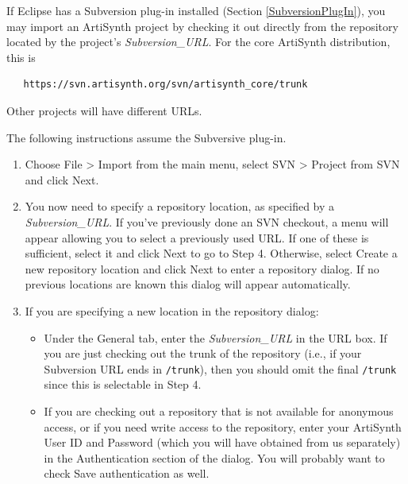 \documentclass{article}
\begin{document}
If Eclipse has a Subversion plug-in installed (Section
\ref{SubversionPlugIn}), you may import an ArtiSynth project by
checking it out directly from the repository located by
the project's {\it Subversion\_URL}. For the core ArtiSynth
distribution, this is 
\begin{verbatim}
   https://svn.artisynth.org/svn/artisynth_core/trunk
\end{verbatim}
Other projects will have different URLs.

The following instructions assume the Subversive plug-in.

\begin{enumerate}

\item Choose {\sf File > Import} from the main menu, select {\sf SVN >
Project from SVN} and click {\sf Next}.

\item You now need to specify a repository location, as specified by a
{\it Subversion\_URL}.  If you've previously done an SVN checkout, a
menu will appear allowing you to select a previously used URL. If one
of these is sufficient, select it and click {\sf Next} to go to Step
4. Otherwise, select {\sf Create a new repository location} and click
{\sf Next} to enter a repository dialog. If no previous locations are
known this dialog will appear automatically.

\item If you are specifying a new location in the repository dialog:

\begin{itemize}

\item Under the {\sf General} tab, enter the {\it Subversion\_URL} in the
{\sf URL} box. If you are just checking out the trunk of the
repository (i.e., if your Subversion URL ends in {\tt /trunk}), then
you should omit the final {\tt /trunk} since this is selectable in Step 4.

\item If you are checking out a repository that is not available for
anonymous access, or if you need write access to the repository, enter
your ArtiSynth User ID and Password (which you will have obtained from
us separately) in the {\sf Authentication} section of the dialog.
You will probably want to check {\sf Save authentication} as well.



\end{itemize}
\end{enumerate}
\end{document}
